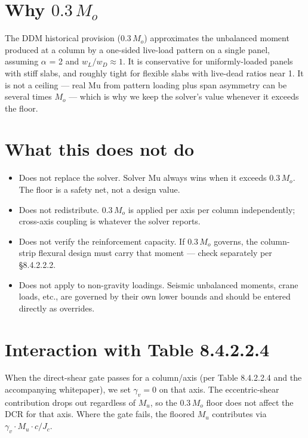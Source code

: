 \documentclass[10pt]{article}
\begin{document}
\section*{Why $0.3\,M_o$}
The DDM historical provision ($0.3\,M_o$) approximates the unbalanced moment produced at a column by a one-sided live-load pattern on a single panel, assuming $\alpha$ = 2 and $w_L / w_D \approx 1$. It is conservative for uniformly-loaded panels with stiff slabs, and roughly tight for flexible slabs with live-dead ratios near 1. It is not a ceiling --- real Mu from pattern loading plus span asymmetry can be several times $M_o$ --- which is why we keep the solver's value whenever it exceeds the floor.

\section*{What this does not do}
\begin{itemize}
\item Does not replace the solver. Solver Mu always wins when it exceeds $0.3\,M_o$. The floor is a safety net, not a design value.
\item Does not redistribute. $0.3\,M_o$ is applied per axis per column independently; cross-axis coupling is whatever the solver reports.
\item Does not verify the reinforcement capacity. If $0.3\,M_o$ governs, the column-strip flexural design must carry that moment --- check separately per \S 8.4.2.2.2.
\item Does not apply to non-gravity loadings. Seismic unbalanced moments, crane loads, etc., are governed by their own lower bounds and should be entered directly as overrides.
\end{itemize}

\section*{Interaction with Table 8.4.2.2.4}
When the direct-shear gate passes for a column/axis (per Table 8.4.2.2.4 and the accompanying whitepaper), we set $\gamma_v = 0$ on that axis. The eccentric-shear contribution drops out regardless of $M_u$, so the $0.3\,M_o$ floor does not affect the DCR for that axis. Where the gate fails, the floored $M_u$ contributes via $\gamma_v \cdot M_u \cdot c / J_c$.
\end{document}
